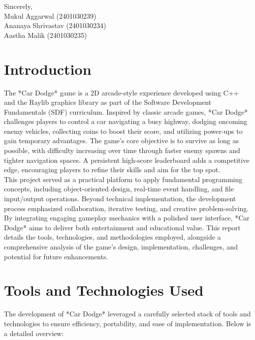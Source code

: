 \documentclass[12pt,a4paper]{article}
\begin{document}
\noindent
Sincerely, \\
\vspace{2em}
\noindent
Mukul Aggarwal (2401030239) \\
Ananaya Shrivastav (2401030234) \\
Aastha Malik (2401030235) \\

\newpage

\tableofcontents

\newpage

\section{Introduction}

The *Car Dodge* game is a 2D arcade-style experience developed using C++ and the Raylib graphics library as part of the Software Development Fundamentals (SDF) curriculum. Inspired by classic arcade games, *Car Dodge* challenges players to control a car navigating a busy highway, dodging oncoming enemy vehicles, collecting coins to boost their score, and utilizing power-ups to gain temporary advantages. The game’s core objective is to survive as long as possible, with difficulty increasing over time through faster enemy spawns and tighter navigation spaces. A persistent high-score leaderboard adds a competitive edge, encouraging players to refine their skills and aim for the top spot. \\

This project served as a practical platform to apply fundamental programming concepts, including object-oriented design, real-time event handling, and file input/output operations. Beyond technical implementation, the development process emphasized collaboration, iterative testing, and creative problem-solving. By integrating engaging gameplay mechanics with a polished user interface, *Car Dodge* aims to deliver both entertainment and educational value. This report details the tools, technologies, and methodologies employed, alongside a comprehensive analysis of the game’s design, implementation, challenges, and potential for future enhancements. \\

\section{Tools and Technologies Used}

The development of *Car Dodge* leveraged a carefully selected stack of tools and technologies to ensure efficiency, portability, and ease of implementation. Below is a detailed overview: \\
\end{document}
